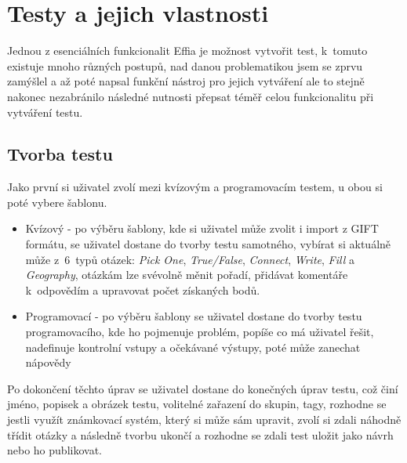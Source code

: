 \documentclass[12pt, a4paper,
openright
]{report}
\begin{document}
\section{Testy a jejich vlastnosti}
Jednou z esenciálních funkcionalit Effia je možnost vytvořit test, k~tomuto existuje mnoho různých postupů, nad danou problematikou jsem se zprvu zamýšlel a až poté napsal funkční nástroj pro jejich vytváření ale to stejně nakonec nezabránilo následné nutnosti přepsat téměř celou funkcionalitu při vytváření testu.

\subsection{Tvorba testu}
\label{subsec:creation}
Jako první si uživatel zvolí mezi kvízovým a programovacím testem, u obou si poté vybere šablonu.
\begin{itemize}
	\item Kvízový - po výběru šablony, kde si uživatel může zvolit i import z GIFT formátu, se uživatel dostane do tvorby testu samotného, vybírat si aktuálně může z~6~typů otázek: \textit{Pick One}, \textit{True/False}, \textit{Connect}, \textit{Write}, \textit{Fill} a \textit{Geography}, otázkám lze svévolně měnit pořadí, přidávat komentáře k~odpovědím a upravovat počet získaných bodů.
	\item Programovací - po výběru šablony se uživatel dostane do tvorby testu programovacího, kde ho pojmenuje problém, popíše co má uživatel řešit, nadefinuje kontrolní vstupy a očekávané výstupy, poté může zanechat nápovědy
\end{itemize}
Po dokončení těchto úprav se uživatel dostane do konečných úprav testu, což činí jméno, popisek a obrázek testu, volitelné zařazení do skupin, tagy, rozhodne se jestli využít známkovací systém, který si může sám upravit, zvolí si zdali náhodně třídit otázky a následně tvorbu ukončí a rozhodne se zdali test uložit jako návrh nebo ho publikovat.
\end{document}
